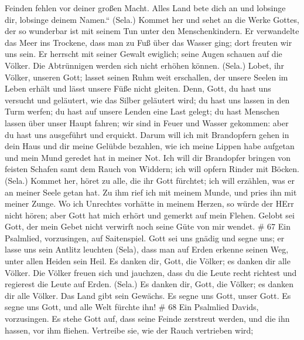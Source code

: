 Feinden fehlen vor deiner großen Macht.  Alles Land bete
dich an und lobsinge dir, lobsinge deinem Namen.`` (Sela.) 
Kommet her und sehet an die Werke Gottes, der so wunderbar ist mit
seinem Tun unter den Menschenkindern.  Er verwandelte das
Meer ins Trockene, dass man zu Fuß über das Wasser ging; dort freuten
wir uns sein.  Er herrscht mit seiner Gewalt ewiglich; seine
Augen schauen auf die Völker. Die Abtrünnigen werden sich nicht erhöhen
können. (Sela.)  Lobet, ihr Völker, unseren Gott; lasset
seinen Ruhm weit erschallen,  der unsere Seelen im Leben
erhält und lässt unsere Füße nicht gleiten.  Denn, Gott, du
hast uns versucht und geläutert, wie das Silber geläutert wird;
 du hast uns lassen in den Turm werfen; du hast auf unsere
Lenden eine Last gelegt;  du hast Menschen lassen über
unser Haupt fahren; wir sind in Feuer und Wasser gekommen: aber du hast
uns ausgeführt und erquickt.  Darum will ich mit
Brandopfern gehen in dein Haus und dir meine Gelübde bezahlen,
 wie ich meine Lippen habe aufgetan und mein Mund geredet
hat in meiner Not.  Ich will dir Brandopfer bringen von
feisten Schafen samt dem Rauch von Widdern; ich will opfern Rinder mit
Böcken. (Sela.)  Kommet her, höret zu alle, die ihr Gott
fürchtet; ich will erzählen, was er an meiner Seele getan hat.
 Zu ihm rief ich mit meinem Munde, und pries ihn mit meiner
Zunge.  Wo ich Unrechtes vorhätte in meinem Herzen, so
würde der HErr nicht hören;  aber Gott hat mich erhört und
gemerkt auf mein Flehen.  Gelobt sei Gott, der mein Gebet
nicht verwirft noch seine Güte von mir wendet. \# 67  Ein
Psalmlied, vorzusingen, auf Saitenspiel.  Gott sei uns
gnädig und segne uns; er lasse uns sein Antlitz leuchten (Sela),
 dass man auf Erden erkenne seinen Weg, unter allen Heiden
sein Heil.  Es danken dir, Gott, die Völker; es danken dir
alle Völker.  Die Völker freuen sich und jauchzen, dass du
die Leute recht richtest und regierest die Leute auf Erden. (Sela.)
 Es danken dir, Gott, die Völker; es danken dir alle Völker.
 Das Land gibt sein Gewächs. Es segne uns Gott, unser Gott.
 Es segne uns Gott, und alle Welt fürchte ihn! \# 68
 Ein Psalmlied Davids, vorzusingen.  Es stehe
Gott auf, dass seine Feinde zerstreut werden, und die ihn hassen, vor
ihm fliehen.  Vertreibe sie, wie der Rauch vertrieben wird;
